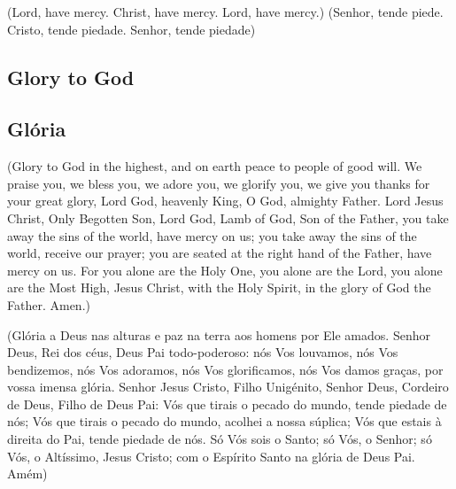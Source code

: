 \documentclass[10pt,a5]{article}
\newcommand \subsect[2] {\subsection*{#1} \switchcolumn \subsection*{#2} \switchcolumn*}
\begin{document}
\begin{paracol}{2}

(Lord, have mercy. Christ, have mercy. Lord, have mercy.)
\switchcolumn
(Senhor, tende piede. Cristo, tende piedade. Senhor, tende piedade)

\switchcolumn*

\subsect{Glory to God}{Gl\'oria}

(Glory to God in the highest,
and on earth peace to people
of good will.
We praise you, we bless you,
we adore you, we glorify you,
we give you thanks for your great
glory,
Lord God, heavenly King, O God,
almighty Father.
Lord Jesus Christ, Only Begotten Son,
Lord God, Lamb of God, Son of the
Father,
you take away the sins of the world,
have mercy on us;
you take away the sins of the world,
receive our prayer;
you are seated at the right hand
of the Father, have mercy on us.
For you alone are the Holy One,
you alone are the Lord,
you alone are the Most High,
Jesus Christ, with the Holy Spirit,
in the glory of God the Father. Amen.)

\switchcolumn

(Gl\'oria a Deus nas alturas e paz na terra aos homens por Ele amados.
 Senhor Deus, Rei dos c\'eus, Deus Pai todo-poderoso:
 n\'os Vos louvamos, n\'os Vos bendizemos, n\'os Vos adoramos, n\'os Vos glorificamos,
 n\'os Vos damos graças, por vossa imensa gl\'oria.
 Senhor Jesus Cristo, Filho Unig\'enito, Senhor Deus, Cordeiro de Deus, Filho de Deus Pai:
 V\'os que tirais o pecado do mundo, tende piedade de n\'os;
 V\'os que tirais o pecado do mundo, acolhei a nossa s\'uplica;
 V\'os que estais \`a direita do Pai, tende piedade de n\'os.
 S\'o V\'os sois o Santo;
 s\'o V\'os, o Senhor;
 s\'o V\'os, o Alt\'issimo, Jesus Cristo;
 com o Esp\'irito Santo na gl\'oria de Deus Pai.
 Am\'em)

 \switchcolumn*

\end{paracol}
\end{document}
